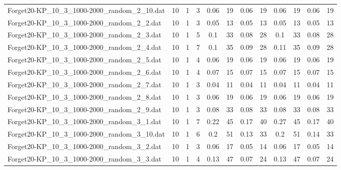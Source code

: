 \begin{sidewaystable}[!ht]
{\begin{tabular}{lccccccccccc}
Forget20-KP\_10\_3\_1000-2000\_random\_2\_10.dat & 10 & 1 & 3 &  \textcolor{blue2}{0.06} & 19 &  \textcolor{blue2}{0.06} & 19 &  \textcolor{blue2}{0.06} & 19 &  \textcolor{blue2}{0.06} & 19 \\
Forget20-KP\_10\_3\_1000-2000\_random\_2\_2.dat & 10 & 1 & 3 &  \textcolor{blue2}{0.05} & 13 &  \textcolor{blue2}{0.05} & 13 &  \textcolor{blue2}{0.05} & 13 &  \textcolor{blue2}{0.05} & 13 \\
Forget20-KP\_10\_3\_1000-2000\_random\_2\_3.dat & 10 & 1 & 5 & 0.1 & 33 &  \textcolor{blue2}{0.08} & 28 & 0.1 & 33 &  \textcolor{blue2}{0.08} & 28 \\
Forget20-KP\_10\_3\_1000-2000\_random\_2\_4.dat & 10 & 1 & 7 & 0.1 & 35 &  \textcolor{blue2}{0.09} & 28 & 0.11 & 35 &  \textcolor{blue2}{0.09} & 28 \\
Forget20-KP\_10\_3\_1000-2000\_random\_2\_5.dat & 10 & 1 & 4 &  \textcolor{blue2}{0.06} & 19 &  \textcolor{blue2}{0.06} & 19 &  \textcolor{blue2}{0.06} & 19 &  \textcolor{blue2}{0.06} & 19 \\
Forget20-KP\_10\_3\_1000-2000\_random\_2\_6.dat & 10 & 1 & 4 &  \textcolor{blue2}{0.07} & 15 &  \textcolor{blue2}{0.07} & 15 &  \textcolor{blue2}{0.07} & 15 &  \textcolor{blue2}{0.07} & 15 \\
Forget20-KP\_10\_3\_1000-2000\_random\_2\_7.dat & 10 & 1 & 3 &  \textcolor{blue2}{0.04} & 11 &  \textcolor{blue2}{0.04} & 11 &  \textcolor{blue2}{0.04} & 11 &  \textcolor{blue2}{0.04} & 11 \\
Forget20-KP\_10\_3\_1000-2000\_random\_2\_8.dat & 10 & 1 & 3 &  \textcolor{blue2}{0.06} & 19 &  \textcolor{blue2}{0.06} & 19 &  \textcolor{blue2}{0.06} & 19 &  \textcolor{blue2}{0.06} & 19 \\
Forget20-KP\_10\_3\_1000-2000\_random\_2\_9.dat & 10 & 1 & 3 &  \textcolor{blue2}{0.08} & 33 &  \textcolor{blue2}{0.08} & 33 &  \textcolor{blue2}{0.08} & 33 &  \textcolor{blue2}{0.08} & 33 \\
Forget20-KP\_10\_3\_1000-2000\_random\_3\_1.dat & 10 & 1 & 7 & 0.22 & 45 &  \textcolor{blue2}{0.17} & 40 & 0.27 & 45 &  \textcolor{blue2}{0.17} & 40 \\
Forget20-KP\_10\_3\_1000-2000\_random\_3\_10.dat & 10 & 1 & 6 & 0.2 & 51 &  \textcolor{blue2}{0.13} & 33 & 0.2 & 51 & 0.14 & 33 \\
Forget20-KP\_10\_3\_1000-2000\_random\_3\_2.dat & 10 & 1 & 3 & 0.06 & 17 &  \textcolor{blue2}{0.05} & 14 & 0.06 & 17 &  \textcolor{blue2}{0.05} & 14 \\
Forget20-KP\_10\_3\_1000-2000\_random\_3\_3.dat & 10 & 1 & 4 & 0.13 & 47 &  \textcolor{blue2}{0.07} & 24 & 0.13 & 47 &  \textcolor{blue2}{0.07} & 24 \\

\end{tabular}}
\end{sidewaystable}
